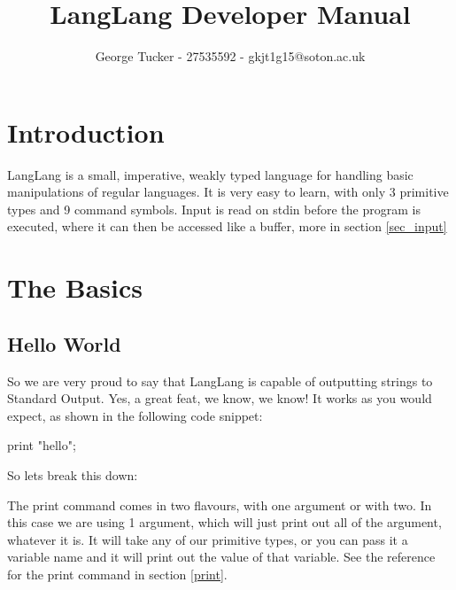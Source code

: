 \documentclass{article}
\title{LangLang Developer Manual}
\author{George Tucker - 27535592 - gkjt1g15@soton.ac.uk}
\begin{document}
\maketitle
\section{Introduction}
\begin{normalsize}
LangLang is a small, imperative, weakly typed language for handling basic manipulations of regular languages. It is very easy to learn, with only 3 primitive types and 9 command symbols. Input is read on stdin before the program is executed, where it can then be accessed like a buffer, more in section \ref{sec_input}
\end{normalsize}

\section{The Basics}
\subsection{Hello World}
\label{helloworld}
\begin{normalsize}
So we are very proud to say that LangLang is capable of outputting strings to Standard Output. Yes, a great feat, we know, we know! It works as you would expect, as shown in the following code snippet:

print "hello";

So lets break this down:

The print command comes in two flavours, with one argument or with two. In this case we are using 1 argument, which will just print out all of the argument, whatever it is. It will take any of our primitive types, or you can pass it a variable name and it will print out the value of that variable. See the reference for the print command in section \ref{print}.
\end{normalsize}




\end{document}
